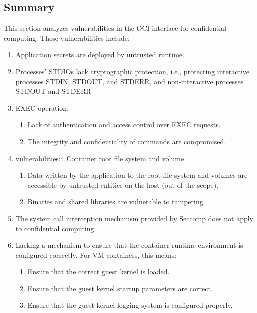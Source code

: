 \subsection{Summary}
\label{sec:security_analyse_oci_summary}
This section analyzes vulnerabilities in the OCI interface for confidential computing. These vulnerabilities include:
 \begin{enumerate}
  \item\label{vulnerability:1} Application secrets are deployed by untrusted runtime.
  \item\label{vulnerabilities:2} Processes' STDIOs lack cryptographic protection, i.e., protecting interactive processes STDIN, STDOUT, and STDERR, and non-interactive processes STDOUT and STDERR
  \item\label{vulnerabilities:3}EXEC operation:
      \begin{enumerate}
        \item Lack of authentication and access control over EXEC requests.
        \item The integrity and confidentiality of commands are compromised.
      \end{enumerate}
  \item{vulnerabilities:4} Container root file system and volume
      \begin{enumerate}
        \item Data written by the application to the root file system and volumes are accessible by untrusted entities on the host (out of the scope).
        \item Binaries and shared libraries are vulnerable to tampering.
      \end{enumerate}
  \item\label{vulnerabilities:5} The system call interception mechanism provided by Seccomp does not apply to confidential computing.
  \item\label{vulnerabilities:6} Lacking a mechanism to ensure that the container runtime environment is configured correctly. For VM containers, this means:
      \begin{enumerate}
        \item Ensure that the correct guest kernel is loaded.
        \item\label{vulnerabilities:10} Ensure that the guest kernel startup parameters are correct.
        \item\label{vulnerabilities:11} Ensure that the guest kernel logging system is configured properly.
      \end{enumerate}
\end{enumerate}


